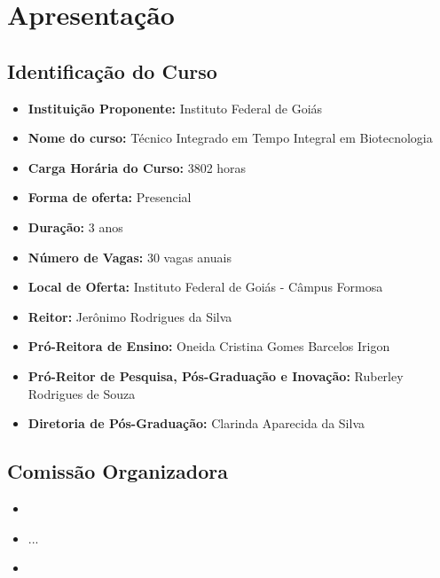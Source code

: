 \documentclass[11pt,fleqn]{book} %
\begin{document}
\renewcommand\contentsname{Sumário}
\tableofcontents

\chapter{Apresentação}
\vspace{6em}
\begin{flushright}
	\textit{ }
\end{flushright}
\vspace{12em}



\newpage  
\section{Identificação do Curso}
\begin{itemize}
	\item \textbf{Instituição Proponente:} Instituto Federal de Goiás
	\item \textbf{Nome do curso:} Técnico Integrado em Tempo Integral em Biotecnologia
	\item \textbf{Carga Horária do Curso:} 3802 horas
	\item \textbf{Forma de oferta:} Presencial
	\item \textbf{Duração:} 3 anos
	\item \textbf{Número de Vagas:} 30 vagas anuais
	\item \textbf{Local de Oferta:} Instituto Federal de Goiás - Câmpus Formosa
	\item \textbf{Reitor:} Jerônimo Rodrigues da Silva
	\item \textbf{Pró-Reitora de Ensino:} Oneida Cristina Gomes Barcelos Irigon
	\item \textbf{Pró-Reitor de Pesquisa, Pós-Graduação e Inovação:} Ruberley Rodrigues de Souza
	\item \textbf{Diretoria de Pós-Graduação:} Clarinda Aparecida da Silva
\end{itemize}

\section{Comissão Organizadora}
	\begin{itemize}[label=\bfseries]
		\item {}
		\item ...
		\item {}
	\end{itemize}
\end{document}
